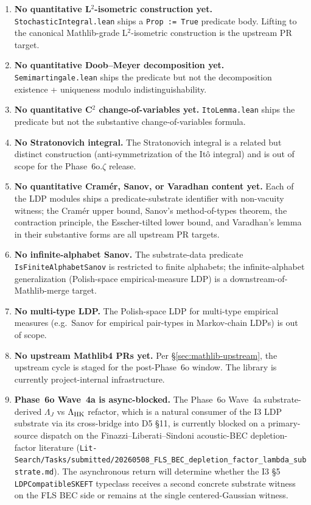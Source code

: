 \documentclass[11pt]{article}
\begin{document}
\begin{enumerate}
\item \textbf{No quantitative L${}^2$-isometric construction yet.}
  \texttt{StochasticIntegral.lean} ships a \texttt{Prop := True}
  predicate body. Lifting to the canonical Mathlib-grade L${}^2$-isometric
  construction is the upstream PR target.
\item \textbf{No quantitative Doob--Meyer decomposition yet.}
  \texttt{Semimartingale.lean} ships the predicate but not the
  decomposition existence + uniqueness modulo indistinguishability.
\item \textbf{No quantitative C${}^2$ change-of-variables yet.}
  \texttt{ItoLemma.lean} ships the predicate but not the substantive
  change-of-variables formula.
\item \textbf{No Stratonovich integral.} The Stratonovich integral is
  a related but distinct construction (anti-symmetrization of the
  It\^o integral) and is out of scope for the Phase~6o.$\zeta$
  release.
\item \textbf{No quantitative Cram\'er, Sanov, or Varadhan content
  yet.} Each of the LDP modules ships a predicate-substrate identifier
  with non-vacuity witness; the Cram\'er upper bound, Sanov's
  method-of-types theorem, the contraction principle, the Esscher-tilted
  lower bound, and Varadhan's lemma in their substantive forms are all
  upstream PR targets.
\item \textbf{No infinite-alphabet Sanov.} The substrate-data
  predicate \texttt{IsFiniteAlphabetSanov} is restricted to finite
  alphabets; the infinite-alphabet generalization (Polish-space
  empirical-measure LDP) is a downstream-of-Mathlib-merge target.
\item \textbf{No multi-type LDP.} The Polish-space LDP for
  multi-type empirical measures (e.g.\ Sanov for empirical pair-types
  in Markov-chain LDPs) is out of scope.
\item \textbf{No upstream Mathlib4 PRs yet.} Per
  \S\ref{sec:mathlib-upstream}, the upstream cycle is staged for
  the post-Phase~6o window. The library is currently
  project-internal infrastructure.
\item \textbf{Phase~6o Wave~4a is async-blocked.} The Phase~6o
  Wave~4a substrate-derived $\Lambda_J$ vs $\Lambda_{\rm HK}$ refactor,
  which is a natural consumer of the I3 LDP substrate via its
  cross-bridge into D5 §11, is currently blocked on a
  primary-source dispatch on the Finazzi--Liberati--Sindoni
  acoustic-BEC depletion-factor literature
  (\texttt{Lit-Search/Tasks/submitted/20260508\_FLS\_BEC\_depletion\_factor\_lambda\_substrate.md}).
  The asynchronous return will determine whether the I3 §5
  \texttt{LDPCompatibleSKEFT} typeclass receives a second concrete
  substrate witness on the FLS BEC side or remains at the single
  centered-Gaussian witness.
\end{enumerate}
\end{document}
